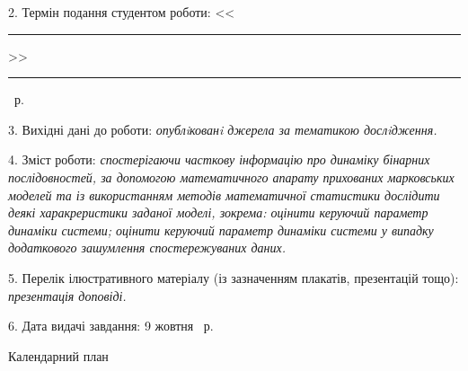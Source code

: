 2. Термін подання студентом роботи: <<\rule{0.5cm}{0.25pt}>> \rule{2.5cm}{0.25pt} \YearOfDefence~р.

3. Вихідні дані до роботи: \emph{опублiкованi джерела за тематикою дослiдження.}

4. Зміст роботи: \emph{спостерігаючи часткову інформацію про динаміку бінарних послідовностей, за допомогою математичного апарату прихованих марковських моделей та із використанням методів математичної статистики дослідити деякі харакреристики заданої моделі, зокрема: оцінити керуючий параметр динаміки системи; оцінити керуючий параметр динаміки системи у випадку додаткового зашумлення спостережуваних даних.}

5. Перелік ілюстративного матеріалу (із зазначенням плакатів, презентацій 
тощо): \emph{презентація доповіді.}

6. Дата видачі завдання: 9 жовтня \YearOfBeginning~р.


\begin{center}
Календарний план
\end{center}

